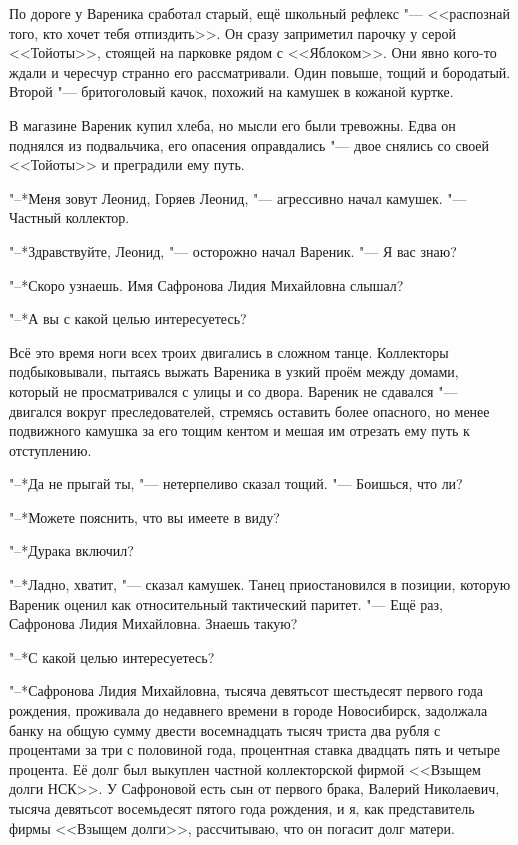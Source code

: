 По дороге у Вареника сработал старый, ещё школьный рефлекс "--- <<распознай того, кто хочет тебя отпиздить>>.
Он сразу заприметил парочку у серой <<Тойоты>>, стоящей на парковке рядом с <<Яблоком>>.
Они явно кого-то ждали и чересчур странно его рассматривали.
Один повыше, тощий и бородатый.
Второй "--- бритоголовый качок, похожий на камушек в кожаной куртке.

В магазине Вареник купил хлеба, но мысли его были тревожны.
Едва он поднялся из подвальчика, его опасения оправдались "--- двое снялись со своей <<Тойоты>> и преградили ему путь.

\asterism

"--*Меня зовут Леонид, Горяев Леонид, "--- агрессивно начал камушек.
"--- Частный коллектор.

"--*Здравствуйте, Леонид, "--- осторожно начал Вареник.
"--- Я вас знаю?

"--*Скоро узнаешь.
Имя Сафронова Лидия Михайловна слышал?

"--*А вы с какой целью интересуетесь?

Всё это время ноги всех троих двигались в сложном танце.
Коллекторы подбыковывали, пытаясь выжать Вареника в узкий проём между домами, который не просматривался с улицы и со двора.
Вареник не сдавался "--- двигался вокруг преследователей, стремясь оставить более опасного, но менее подвижного камушка за его тощим кентом и мешая им отрезать ему путь к отступлению.

"--*Да не прыгай ты, "--- нетерпеливо сказал тощий.
"--- Боишься, что ли?

"--*Можете пояснить, что вы имеете в виду?

"--*Дурака включил?

"--*Ладно, хватит, "--- сказал камушек.
Танец приостановился в позиции, которую Вареник оценил как относительный тактический паритет.
"--- Ещё раз, Сафронова Лидия Михайловна.
Знаешь такую?

"--*С какой целью интересуетесь?

"--*Сафронова Лидия Михайловна, тысяча девятьсот шестьдесят первого года рождения, проживала до недавнего времени в городе Новосибирск, задолжала банку на общую сумму двести восемнадцать тысяч триста два рубля с процентами за три с половиной года, процентная ставка двадцать пять и четыре процента.
Её долг был выкуплен частной коллекторской фирмой <<Взыщем долги НСК>>.
У Сафроновой есть сын от первого брака, Валерий Николаевич, тысяча девятьсот восемьдесят пятого года рождения, и я, как представитель фирмы <<Взыщем долги>>, рассчитываю, что он погасит долг матери.

